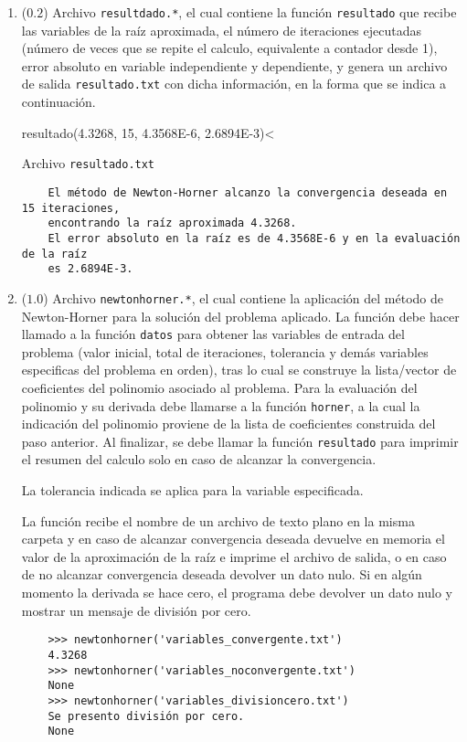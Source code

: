 \documentclass[12pt]{article}
\begin{document}
\begin{enumerate}[leftmargin=*,widest=9]
\begin{enumerate}[label=\alph*]
    \item (\(0.2\)) Archivo \verb-resultdado.*-, el cual contiene la función \verb-resultado- que recibe las variables de la raíz aproximada, el número de iteraciones ejecutadas (número de veces que se repite el calculo, equivalente a contador desde 1), error absoluto en variable independiente y dependiente, y genera un archivo de salida \verb-resultado.txt- con dicha información, en la forma que se indica a continuación.

    \verb<    >>> resultado(4.3268, 15, 4.3568E-6, 2.6894E-3)<

    Archivo \verb-resultado.txt-
    \begin{verbatim}
    El método de Newton-Horner alcanzo la convergencia deseada en 15 iteraciones,
    encontrando la raíz aproximada 4.3268.
    El error absoluto en la raíz es de 4.3568E-6 y en la evaluación de la raíz
    es 2.6894E-3.
    \end{verbatim}

    \item (\(1.0\)) Archivo \verb-newtonhorner.*-, el cual contiene la aplicación del método de Newton-Horner para la solución del problema aplicado. La función debe hacer llamado a la función \verb-datos- para obtener las variables de entrada del problema (valor inicial, total de iteraciones, tolerancia y demás variables especificas del problema en orden), tras lo cual se construye la lista/vector de coeficientes del polinomio asociado al problema. Para la evaluación del polinomio y su derivada debe llamarse a la función \verb-horner-, a la cual la indicación del polinomio proviene de la lista de coeficientes construida del paso anterior. Al finalizar, se debe llamar la función \verb-resultado- para imprimir el resumen del calculo solo en caso de alcanzar la convergencia.

La tolerancia indicada se aplica para la variable especificada.

La función recibe el nombre de un archivo de texto plano en la misma carpeta y en caso de alcanzar convergencia deseada devuelve en memoria el valor de la aproximación de la raíz e imprime el archivo de salida, o en caso de no alcanzar convergencia deseada devolver un dato nulo. Si en algún momento la derivada se hace cero, el programa debe devolver un dato nulo y mostrar un mensaje de división por cero.
    \begin{verbatim}
    >>> newtonhorner('variables_convergente.txt')
    4.3268
    >>> newtonhorner('variables_noconvergente.txt')
    None
    >>> newtonhorner('variables_divisioncero.txt')
    Se presento división por cero.
    None
    \end{verbatim}


\end{enumerate}
\end{enumerate}
\end{document}
